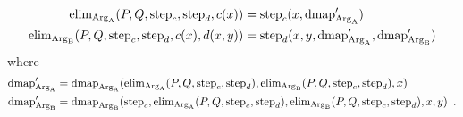 \documentclass[orivec,envcountsame, ,envcountsect]{llncs}
\begin{document}
\begin{definition}
\begin{align*}
\text{elim}_{\text{Arg}_{\text{A}}}(P, Q, \text{step}_{c}, \text{step}_{d}, c(x)) &= \text{step}_{c}(x, \text{dmap}_{\text{Arg}_{\text{A}}}') \\
 \text{elim}_{\text{Arg}_{\text{B}}}(P, Q, \text{step}_{c}, \text{step}_{d}, c(x), d(x, y)) &=
 \text{step}_{d}(x, y, \text{dmap}_{\text{Arg}_{\text{A}}}',  \text{dmap}_{\text{Arg}_{\text{B}}}')
\end{align*}
where 
\begin{align*}
\text{dmap}_{\text{Arg}_{\text{A}}}' &= \text{dmap}_{\text{Arg}_{\text{A}}}(\text{elim}_{\text{Arg}_{\text{A}}}(P, Q, \text{step}_{c}, \text{step}_{d}), \text{elim}_{\text{Arg}_{\text{B}}}(P, Q, \text{step}_{c}, \text{step}_{d}), x) \\
\text{dmap}_{\text{Arg}_{\text{B}}}' &= \text{dmap}_{\text{Arg}_{\text{B}}}(\text{step}_{c}, \text{elim}_{\text{Arg}_{\text{A}}}(P, Q, \text{step}_{c}, \text{step}_{d}), \text{elim}_{\text{Arg}_{\text{B}}}(P, Q, \text{step}_{c}, \text{step}_{d}), x, y) \enspace .
\end{align*}

\end{definition}
\end{document}
